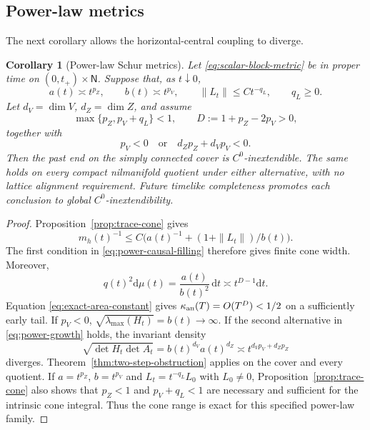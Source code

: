 \documentclass[10pt,a4paper]{article}
\numberwithin{equation}{section}
\newtheorem{corollary}[theorem]{Corollary}
\theoremstyle{definition}
\theoremstyle{remark}
\newcommand{\dd}{\mathrm d}
\begin{document}
\subsection{Power-law metrics}

The next corollary allows the horizontal-central coupling to diverge.

\begin{corollary}[Power-law Schur metrics]
\label{cor:power-law}
Let \eqref{eq:scalar-block-metric} be in proper time on
$(0,t_+)\times\mathsf N$.  Suppose that, as $t\downarrow0$,
\begin{equation}
 a(t)\asymp t^{p_Z},\qquad b(t)\asymp t^{p_V},
 \qquad \|L_t\|\le C t^{-q_L},\qquad q_L\ge0.
 \label{eq:power-asymptotics}
\end{equation}
Let $d_V=\dim V$, $d_Z=\dim Z$, and assume
\begin{equation}
 \max\{p_Z,p_V+q_L\}<1,\qquad
 D:=1+p_Z-2p_V>0,
 \label{eq:power-causal-filling}
\end{equation}
together with
\begin{equation}
 p_V<0
 \quad\text{or}\quad
 d_Zp_Z+d_Vp_V<0.
 \label{eq:power-growth}
\end{equation}
Then the past end on the simply connected cover is $C^0$-inextendible.  The
same holds on every compact nilmanifold quotient under either alternative,
with no lattice alignment requirement.  Future timelike
completeness promotes each conclusion to global $C^0$-inextendibility.
\end{corollary}

\begin{proof}
Proposition~\ref{prop:trace-cone} gives
\[
 m_h(t)^{-1}\le C\bigl(a(t)^{-1}+(1+\|L_t\|)/b(t)\bigr).
\]
The first condition in \eqref{eq:power-causal-filling} therefore gives
finite cone width.  Moreover,
\[
 q(t)^2\dd\mu(t)=\frac{a(t)}{b(t)^2}\,\dd t
 \asymp t^{D-1}\dd t.
\]
Equation \eqref{eq:exact-area-constant} gives
$\kappa_{\rm an}(T)=O(T^D)<1/2$ on a sufficiently early tail.  If $p_V<0$,
$\sqrt{\lambda_{\max}(H_t)}=b(t)\to\infty$.  If the second alternative in
\eqref{eq:power-growth} holds, the invariant density
\[
 \sqrt{\det H_t\det A_t}=b(t)^{d_V}a(t)^{d_Z}
 \asymp t^{d_Vp_V+d_Zp_Z}
\]
diverges.  Theorem~\ref{thm:two-step-obstruction} applies on the cover and
every quotient.  If $a=t^{p_Z}$, $b=t^{p_V}$ and
$L_t=t^{-q_L}L_0$ with $L_0\ne0$, Proposition~\ref{prop:trace-cone}
also shows that $p_Z<1$ and $p_V+q_L<1$ are necessary and sufficient
for the intrinsic cone integral.  Thus the cone range is exact for this
specified power-law family.
\end{proof}
\end{document}
